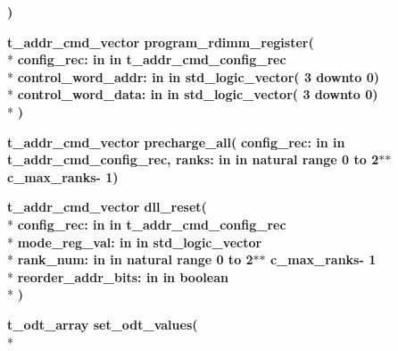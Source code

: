 \begin{DoxyCompactItemize}
{\bfseries  )} 
\item 
{\bfseries {\bfseries \textcolor{vhdlchar}{t\+\_\+addr\+\_\+cmd\+\_\+vector}\textcolor{vhdlchar}{ }}} {\bf program\+\_\+rdimm\+\_\+register}{\bfseries  ( }\\*
{\bfseries \textcolor{vhdlchar}{config\+\_\+rec\+: }\textcolor{stringliteral}{in }\textcolor{vhdlchar}{in t\+\_\+addr\+\_\+cmd\+\_\+config\+\_\+rec}}\\*
{\bfseries \textcolor{vhdlchar}{control\+\_\+word\+\_\+addr\+: }\textcolor{stringliteral}{in }\textcolor{vhdlchar}{in std\+\_\+logic\+\_\+vector( 3 downto  0)}}\\*
{\bfseries \textcolor{vhdlchar}{control\+\_\+word\+\_\+data\+: }\textcolor{stringliteral}{in }\textcolor{vhdlchar}{in std\+\_\+logic\+\_\+vector( 3 downto  0)}}\\*
{\bfseries  )} 
\item 
{\bfseries {\bfseries \textcolor{vhdlchar}{t\+\_\+addr\+\_\+cmd\+\_\+vector}\textcolor{vhdlchar}{ }}} {\bf precharge\+\_\+all}{\bfseries  ( }{\bfseries \textcolor{vhdlchar}{config\+\_\+rec\+: }\textcolor{stringliteral}{in }\textcolor{vhdlchar}{in t\+\_\+addr\+\_\+cmd\+\_\+config\+\_\+rec}}{\bfseries  , \textcolor{vhdlchar}{ranks\+: }\textcolor{stringliteral}{in }\textcolor{vhdlchar}{in natural   range  0 to  2$\ast$$\ast$   c\+\_\+max\+\_\+ranks-\/ 1}}{\bfseries  )} 
\item 
{\bfseries {\bfseries \textcolor{vhdlchar}{t\+\_\+addr\+\_\+cmd\+\_\+vector}\textcolor{vhdlchar}{ }}} {\bf dll\+\_\+reset}{\bfseries  ( }\\*
{\bfseries \textcolor{vhdlchar}{config\+\_\+rec\+: }\textcolor{stringliteral}{in }\textcolor{vhdlchar}{in t\+\_\+addr\+\_\+cmd\+\_\+config\+\_\+rec}}\\*
{\bfseries \textcolor{vhdlchar}{mode\+\_\+reg\+\_\+val\+: }\textcolor{stringliteral}{in }\textcolor{vhdlchar}{in std\+\_\+logic\+\_\+vector}}\\*
{\bfseries \textcolor{vhdlchar}{rank\+\_\+num\+: }\textcolor{stringliteral}{in }\textcolor{vhdlchar}{in natural   range  0 to  2$\ast$$\ast$   c\+\_\+max\+\_\+ranks-\/ 1}}\\*
{\bfseries \textcolor{vhdlchar}{reorder\+\_\+addr\+\_\+bits\+: }\textcolor{stringliteral}{in }\textcolor{vhdlchar}{in boolean}}\\*
{\bfseries  )} 
\item 
{\bfseries {\bfseries \textcolor{vhdlchar}{t\+\_\+odt\+\_\+array}\textcolor{vhdlchar}{ }}} {\bf set\+\_\+odt\+\_\+values}{\bfseries  ( }\\*

\end{DoxyCompactItemize}
